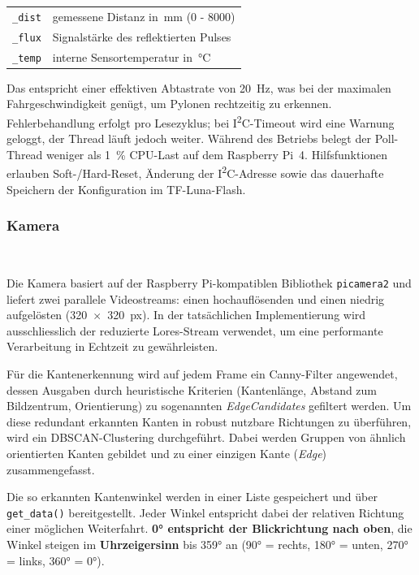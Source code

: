 \documentclass[main.tex]{subfiles} %
\begin{document}
\begin{center}
  \begin{tabular}{@{}ll@{}}
    \texttt{\_dist} & gemessene Distanz in~\si{mm} (0 - 8000)\\
    \texttt{\_flux} & Signalstärke des reflektierten Pulses\\
    \texttt{\_temp} & interne Sensortemperatur in~\si{\celsius}
  \end{tabular}
\end{center}

Das entspricht einer effektiven Abtastrate von \SI{20}{Hz}, was bei der
maximalen Fahrgeschwindigkeit genügt, um Pylonen rechtzeitig zu erkennen.
Fehlerbehandlung erfolgt pro Lesezyklus; bei I\textsuperscript{2}C-Timeout
wird eine Warnung geloggt, der Thread läuft jedoch weiter.
Während des Betriebs belegt der Poll-Thread weniger als
\SI{1}{\percent} CPU-Last auf dem Raspberry Pi~4.
Hilfsfunktionen erlauben Soft-/Hard-Reset, Änderung der
I\textsuperscript{2}C-Adresse
sowie das dauerhafte Speichern der Konfiguration im TF-Luna-Flash.

\subsubsection*{Kamera}~\label{sec:Sensorik_Kamera}

Die Kamera basiert auf der Raspberry Pi-kompatiblen Bibliothek 
\texttt{picamera2} und liefert zwei parallele Videostreams: einen 
hochauflösenden und einen niedrig aufgelösten (320~$\times$~320~px). 
In der tatsächlichen Implementierung wird ausschliesslich der reduzierte 
Lores-Stream verwendet, um eine performante Verarbeitung in Echtzeit 
zu gewährleisten.

Für die Kantenerkennung wird auf jedem Frame ein Canny-Filter angewendet, 
dessen Ausgaben durch heuristische Kriterien (Kantenlänge, Abstand zum 
Bildzentrum, Orientierung) zu sogenannten \textit{EdgeCandidates} gefiltert 
werden. Um diese redundant erkannten Kanten in robust nutzbare Richtungen 
zu überführen, wird ein DBSCAN-Clustering durchgeführt. Dabei werden Gruppen 
von ähnlich orientierten Kanten gebildet und zu einer einzigen Kante 
(\textit{Edge}) zusammengefasst.

Die so erkannten Kantenwinkel werden in einer Liste gespeichert und über 
\texttt{get\_data()} bereitgestellt. Jeder Winkel entspricht dabei der 
relativen Richtung einer möglichen Weiterfahrt. 
\textbf{0° entspricht der Blickrichtung nach oben}, die Winkel steigen 
im \textbf{Uhrzeigersinn} bis 359° an (90° = rechts, 180° = unten, 270° = 
links, 360° = 0°).
\end{document}
